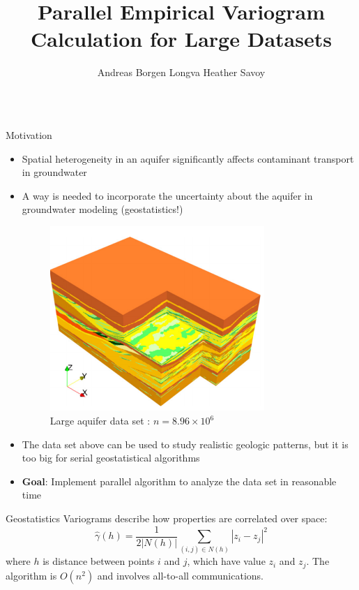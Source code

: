 \documentclass[serif,mathserif,final]{beamer}
\title{Parallel Empirical Variogram Calculation for Large Datasets}
\author{Andreas Borgen Longva \quad Heather Savoy}
\institute{University of California, Berkeley}
\begin{document}
\begin{frame}{}
  \begin{columns}[t]

    \begin{column}{0.32\linewidth}

      \begin{block}{Motivation}
   
	 \begin{itemize}
	 	\item Spatial heterogeneity in an aquifer significantly affects contaminant transport in groundwater
		\item A way is needed to incorporate the uncertainty about the aquifer in groundwater modeling (geostatistics!)
         
         \begin{figure}[htbp]
            \centering
            \includegraphics[height=7cm]{herten.png} %
            \caption{Large aquifer data set : $n=8.96\times 10^6$ \cite{Comunian2011a}}
            \label{fig:example}
         \end{figure}
         
         \item The data set above can be used to study realistic geologic patterns, but it is too big for serial geostatistical algorithms
         \item \textbf{Goal}: Implement parallel algorithm to analyze the data set in reasonable time
          \end{itemize}
      \end{block}

      \begin{block}{Geostatistics}
      Variograms describe how properties are correlated over space:
        \begin{equation*}
		\hat{\gamma}(h)=\frac{1}{2|N(h)|}\sum_{(i,j)\in N(h)} |z_i-z_j|^2
	\end{equation*}
	where $h$ is distance between points $i$ and $j$, which have value $z_i$ and $z_j$. The algorithm is $O(n^2)$ and involves all-to-all communications.
	

\end{block}
\end{column}
\end{columns}
\end{frame}
\end{document}
